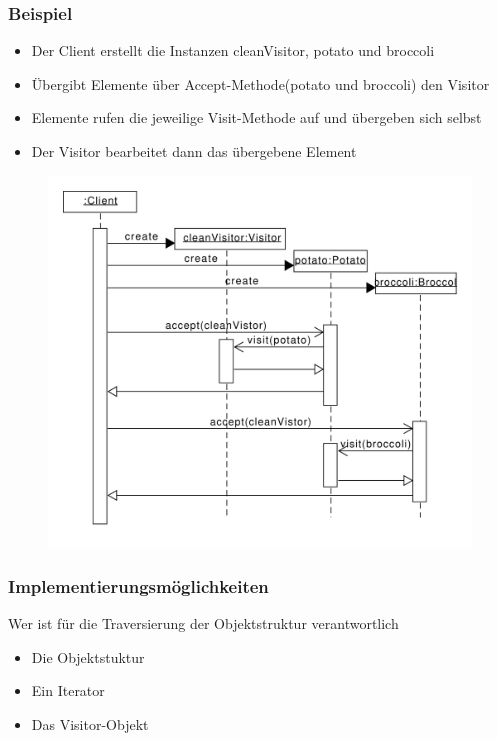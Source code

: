 \begin{frame}
	\frametitle{Beispiel}		
	\begin{itemize}
		\item Der Client erstellt die Instanzen cleanVisitor, potato und broccoli
		\item Übergibt Elemente über Accept-Methode(potato und broccoli) den Visitor
		\item Elemente rufen die jeweilige Visit-Methode auf und übergeben sich selbst
		\item Der Visitor bearbeitet dann das übergebene Element
	\end{itemize}	
  	\begin{figure}
		\includegraphics[scale=.6]{paper/visitor/visitor_sequenz}
		                                        
	\end{figure}
\end{frame}




\begin{frame}
	\frametitle{Implementierungsmöglichkeiten}
  \begin{block}{Wer ist für die Traversierung der Objektstruktur verantwortlich}
  	\begin{itemize}
  		\item Die Objektstuktur
  		\item Ein Iterator
  		\item Das Visitor-Objekt
  	\end{itemize}
  \end{block}
\end{frame}


